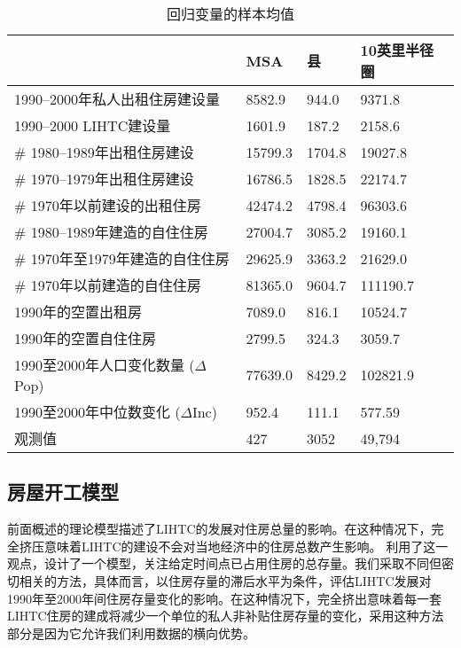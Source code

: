 \documentclass[lang=cn,11pt,a4paper]{paper}
\begin{document}
\renewcommand\arraystretch{1}
\begin{table}[h]
  \centering
  \setlength{\tabcolsep}{6mm}
    \caption{回归变量的样本均值}\label{tab3}
      \begin{tabular}{llll}
        \toprule
        & \textbf{MSA} & \textbf{县} & \textbf{10英里半径圈} \\
        \midrule
        1990--2000年私人出租住房建设量 & 8582.9 & 944.0 &
        9371.8 \\
        1990--2000 LIHTC建设量  & 1601.9 & 187.2 & 2158.6 \\
        \# 1980--1989年出租住房建设 & 15799.3 & 1704.8 &
        19027.8 \\
        \# 1970--1979年出租住房建设 & 16786.5 & 1828.5 &
        22174.7 \\
        \# 1970年以前建设的出租住房 & 42474.2 & 4798.4 &
        96303.6 \\
        \# 1980--1989年建造的自住住房 & 27004.7 & 3085.2 &
        19160.1 \\
        \# 1970年至1979年建造的自住住房 & 29625.9 & 3363.2 &
        21629.0 \\
        \# 1970年以前建造的自住住房 & 81365.0 & 9604.7
        & 111190.7 \\
        1990年的空置出租房 & 7089.0 & 816.1 & 10524.7 \\
        1990年的空置自住住房 & 2799.5 & 324.3 &
        3059.7 \\
        1990至2000年人口变化数量 ($\Delta$Pop) & 77639.0 & 8429.2 &
        102821.9 \\
        1990至2000年中位数变化 ($\Delta$Inc) & 952.4 & 111.1 &
        577.59 \\
        观测值 & 427 & 3052 & 49,794 \\
        \bottomrule
      \end{tabular}
  \end{table}

\subsection{房屋开工模型}

前面概述的理论模型描述了LIHTC的发展对住房总量的影响。在这种情况下，完全挤压意味着LIHTC的建设不会对当地经济中的住房总数产生影响。\cite{Sinai20052137} 利用了这一观点，设计了一个模型，关注给定时间点已占用住房的总存量。我们采取不同但密切相关的方法，具体而言，以住房存量的滞后水平为条件，评估LIHTC发展对1990年至2000年间住房存量变化的影响。在这种情况下，完全挤出意味着每一套LIHTC住房的建成将减少一个单位的私人非补贴住房存量的变化，采用这种方法部分是因为它允许我们利用数据的横向优势。
\end{document}
